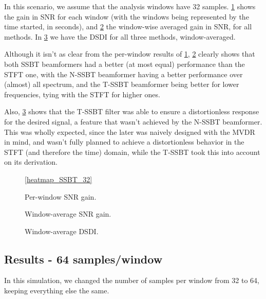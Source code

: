 In this scenario, we assume that the analysis windows have 32 samples. \cref{fig:heatmap_gain_32} shows the gain in SNR for each window (with the windows being represented by the time started, in seconds), and \cref{fig:lineplot_gain_32} the window-wise averaged gain in SNR, for all methods. In \cref{fig:lineplot_dsdi_32} we have the DSDI for all three methods, window-averaged.

Although it isn't as clear from the per-window results of \cref{fig:heatmap_gain_32}, \cref{fig:lineplot_gain_32} clearly shows that both SSBT beamformers had a better (at most equal) performance than the STFT one, with the N-SSBT beamformer having a better performance over (almost) all spectrum, and the T-SSBT beamformer being better for lower frequencies, tying with the STFT for higher ones.

Also, \cref{fig:lineplot_dsdi_32} shows that the T-SSBT filter was able to ensure a distortionless response for the desired signal, a feature that wasn't achieved by the N-SSBT beamformer. This was wholly expected, since the later was naively designed with the MVDR in mind, and wasn't fully planned to achieve a distortionless behavior in the STFT (and therefore the time) domain, while the T-SSBT took this into account on its derivation.



\begin{figure}[H]
	\centering
	
	
	\vspace*{0.4em}
	\ref*{heatmap_SSBT_32}
	\caption{Per-window SNR gain.}
	\label{fig:heatmap_gain_32}
\end{figure}

\begin{figure}[H]
\centering

\caption{Window-average SNR gain.}
\label{fig:lineplot_gain_32}
\end{figure}

\begin{figure}[H]
	\centering
	
	\caption{Window-average DSDI.}
	\label{fig:lineplot_dsdi_32}
\end{figure}
%
\subsection{Results - 64 samples/window}

In this simulation, we changed the number of samples per window from 32 to 64, keeping everything else the same.

